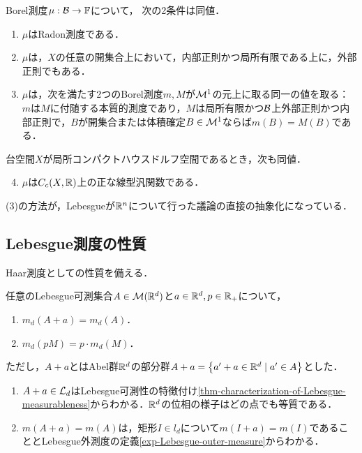 \documentclass[uplatex, dvipdfmx]{jsreport}
\begin{document}
\begin{theorem}[Radon測度の特徴付け]
    Borel測度$\mu:\mathcal{B}\to\mathbb{F}$について，
    次の2条件は同値．
    \begin{enumerate}
        \item $\mu$はRadon測度である．
        \item $\mu$は，$X$の任意の開集合上において，内部正則かつ局所有限である上に，外部正則でもある．
        \item $\mu$は，次を満たす2つのBorel測度$m,M$が$\mathcal{M}^1$の元上に取る同一の値を取る：
        $m$は$M$に付随する本質的測度であり，$M$は局所有限かつ$\mathcal{B}$上外部正則かつ内部正則で，$B$が開集合または体積確定$B\in\mathcal{M}^1$ならば$m(B)=M(B)$である．
    \end{enumerate}
    台空間$X$が局所コンパクトハウスドルフ空間であるとき，次も同値．
    \begin{enumerate}\setcounter{enumi}{3}
        \item $\mu$は$C_c(X,\mathbb{R})$上の正な線型汎関数である．
    \end{enumerate}
\end{theorem}
\begin{remark}
    (3)の方法が，Lebesgueが$\mathbb{R}^n$について行った議論の直接の抽象化になっている．
\end{remark}

\subsection{Lebesgue測度の性質}

\begin{tcolorbox}[colframe=ForestGreen, colback=ForestGreen!10!white,breakable,colbacktitle=ForestGreen!40!white,coltitle=black,fonttitle=\bfseries\sffamily,
title=]
    Haar測度としての性質を備える．
\end{tcolorbox}

\begin{lemma}[Lebesgue測度の線形性]\label{lemma-invariability-of-Lebesgue-measure-under-parallel-transport}
    任意のLebesgue可測集合$A\in\mathcal{M}(\mathbb{R}^d)$と$a\in\mathbb{R}^d,p\in\mathbb{R}_+$について，
    \begin{enumerate}
        \item $m_d(A+a)=m_d(A)$．
        \item $m_d(pM)=p\cdot m_d(M)$．
    \end{enumerate}
    ただし，$A+a$とはAbel群$\mathbb{R}^d$の部分群$A+a=\left\{a'+a\in\mathbb{R}^d\mid a'\in A\right\}$とした．
\end{lemma}
\begin{Proof}\mbox{}
    \begin{enumerate}
        \item $A+a\in\mathcal{L}_d$はLebesgue可測性の特徴付け\ref{thm-characterization-of-Lebesgue-measurableness}からわかる．$\mathbb{R}^d$の位相の様子はどの点でも等質である．
        \item $m(A+a)=m(A)$は，矩形$I\in l_d$について$m(I+a)=m(I)$であることとLebesgue外測度の定義\ref{exp-Lebesgue-outer-measure}からわかる．
    \end{enumerate}
\end{Proof}
\end{document}
